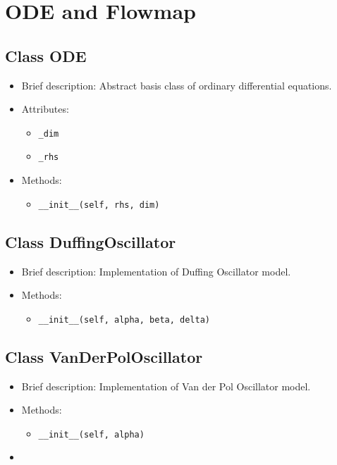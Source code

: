 \section{ODE and Flowmap}

\subsection{Class ODE}

\begin{itemize}
\item Brief description: Abstract basis class of ordinary
  differential equations.
\item Attributes:
  \begin{itemize}
  \item \lstinline|_dim|
  \item \lstinline|_rhs|
  \end{itemize}
\item Methods:
  \begin{itemize}
  \item \lstinline|__init__(self, rhs, dim)|
  \end{itemize}
\end{itemize}

\subsection{Class DuffingOscillator}

\begin{itemize}
\item Brief description: Implementation of Duffing Oscillator model.
\item Methods:
  \begin{itemize}
  \item \lstinline|__init__(self, alpha, beta, delta)|
  \end{itemize}
\end{itemize}

\subsection{Class VanDerPolOscillator}

\begin{itemize}
\item Brief description: Implementation of Van der Pol Oscillator model.
\item Methods:
  \begin{itemize}
  \item \lstinline|__init__(self, alpha)|
  \end{itemize}
\item 
\end{itemize}


